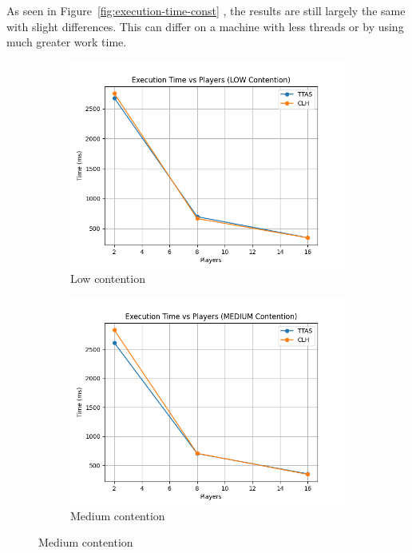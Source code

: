 \documentclass[12pt,a4paper]{article}
\begin{document}
As seen in Figure~\ref{fig:execution-time-const} , the results are still largely the same with slight differences. This can differ on a machine with less threads or by using much greater work time.

\begin{figure}[H]
  \centering
  \begin{subfigure}{0.48\textwidth}
    \centering
    \includegraphics[width=\linewidth]{const_plot_time_LOW.png}
    \caption{Low contention}
    \label{fig:const-time-low}
  \end{subfigure}
  \hfill
  \begin{subfigure}{0.48\textwidth}
    \centering
    \includegraphics[width=\linewidth]{const_plot_time_MEDIUM.png}
    \caption{Medium contention}
    \label{fig:const-time-med}
  \end{subfigure}
  

\end{figure}
\end{document}
